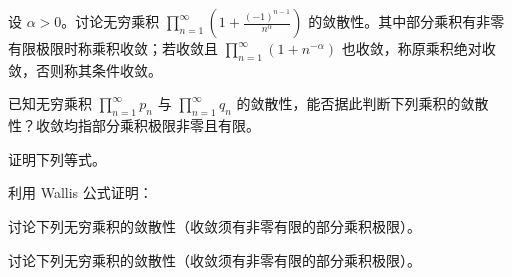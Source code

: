\noindent\begin{minipage}{\textwidth}
设 $\alpha>0$。讨论无穷乘积 $\displaystyle\prod_{n=1}^{\infty}\left(1+\frac{(-1)^{n-1}}{n^\alpha}\right)$ 的敛散性。其中部分乘积有非零有限极限时称乘积收敛；若收敛且 $\displaystyle\prod_{n=1}^{\infty}(1+n^{-\alpha})$ 也收敛，称原乘积绝对收敛，否则称其条件收敛。
\end{minipage}\par\vfill
\noindent\begin{minipage}{\textwidth}
已知无穷乘积 $\prod_{n=1}^{\infty}p_n$ 与 $\prod_{n=1}^{\infty}q_n$ 的敛散性，能否据此判断下列乘积的敛散性？收敛均指部分乘积极限非零且有限。
\end{minipage}\par\vfill
\newpage
\noindent\begin{minipage}{\textwidth}
证明下列等式。
\end{minipage}\par\vfill
\noindent\begin{minipage}{\textwidth}
利用 Wallis 公式证明：
\end{minipage}\par\vfill
\noindent\begin{minipage}{\textwidth}
讨论下列无穷乘积的敛散性（收敛须有非零有限的部分乘积极限）。
\end{minipage}\par\vfill
\newpage
\noindent\begin{minipage}{\textwidth}
讨论下列无穷乘积的敛散性（收敛须有非零有限的部分乘积极限）。
\end{minipage}\par\vfill
